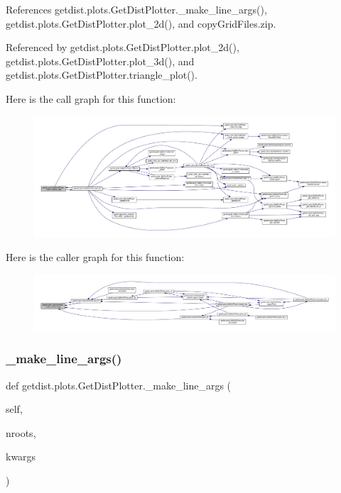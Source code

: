 References getdist.\+plots.\+Get\+Dist\+Plotter.\+\_\+make\+\_\+line\+\_\+args(), getdist.\+plots.\+Get\+Dist\+Plotter.\+plot\+\_\+2d(), and copy\+Grid\+Files.\+zip.



Referenced by getdist.\+plots.\+Get\+Dist\+Plotter.\+plot\+\_\+2d(), getdist.\+plots.\+Get\+Dist\+Plotter.\+plot\+\_\+3d(), and getdist.\+plots.\+Get\+Dist\+Plotter.\+triangle\+\_\+plot().

Here is the call graph for this function\+:
\nopagebreak
\begin{figure}[H]
\begin{center}
\leavevmode
\includegraphics[width=350pt]{classgetdist_1_1plots_1_1GetDistPlotter_af3c4b93770391c350949913b5f3eeaa8_cgraph}
\end{center}
\end{figure}
Here is the caller graph for this function\+:
\nopagebreak
\begin{figure}[H]
\begin{center}
\leavevmode
\includegraphics[width=350pt]{classgetdist_1_1plots_1_1GetDistPlotter_af3c4b93770391c350949913b5f3eeaa8_icgraph}
\end{center}
\end{figure}
\mbox{\label{classgetdist_1_1plots_1_1GetDistPlotter_a7a9e50f1885013fa6dbe70242e1f8fa3}} 
\subsubsection{\texorpdfstring{\+\_\+make\+\_\+line\+\_\+args()}{\_make\_line\_args()}}
{\footnotesize\ttfamily def getdist.\+plots.\+Get\+Dist\+Plotter.\+\_\+make\+\_\+line\+\_\+args (\begin{DoxyParamCaption}\item[{}]{self,  }\item[{}]{nroots,  }\item[{}]{kwargs }\end{DoxyParamCaption})\hspace{0.3cm}{\ttfamily [private]}}



